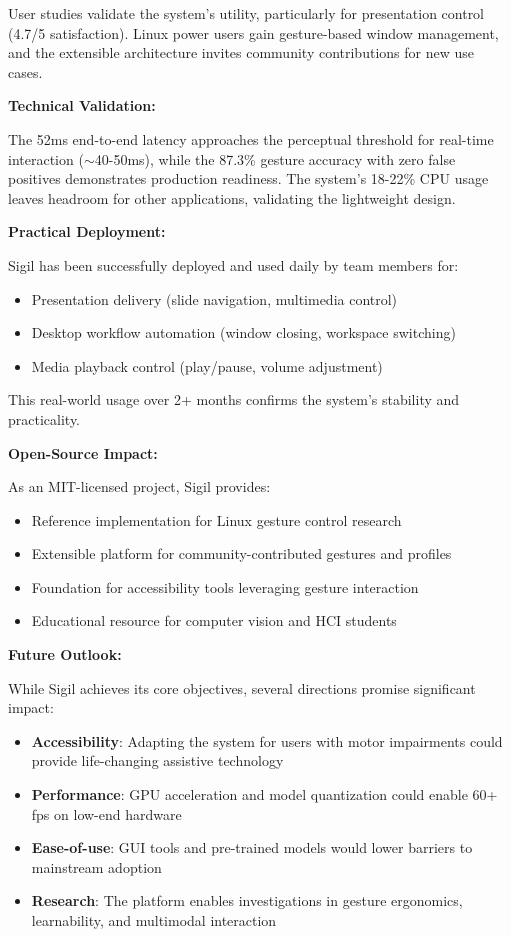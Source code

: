 \documentclass[11pt,a4paper]{article}
\begin{document}
User studies validate the system's utility, particularly for presentation control (4.7/5 satisfaction). Linux power users gain gesture-based window management, and the extensible architecture invites community contributions for new use cases.

\textbf{Technical Validation:}

The 52ms end-to-end latency approaches the perceptual threshold for real-time interaction ($\sim$40-50ms), while the 87.3\% gesture accuracy with zero false positives demonstrates production readiness. The system's 18-22\% CPU usage leaves headroom for other applications, validating the lightweight design.

\textbf{Practical Deployment:}

Sigil has been successfully deployed and used daily by team members for:
\begin{itemize}
\item Presentation delivery (slide navigation, multimedia control)
\item Desktop workflow automation (window closing, workspace switching)
\item Media playback control (play/pause, volume adjustment)
\end{itemize}

This real-world usage over 2+ months confirms the system's stability and practicality.

\textbf{Open-Source Impact:}

As an MIT-licensed project, Sigil provides:
\begin{itemize}
\item Reference implementation for Linux gesture control research
\item Extensible platform for community-contributed gestures and profiles
\item Foundation for accessibility tools leveraging gesture interaction
\item Educational resource for computer vision and HCI students
\end{itemize}

\textbf{Future Outlook:}

While Sigil achieves its core objectives, several directions promise significant impact:

\begin{itemize}
\item \textbf{Accessibility}: Adapting the system for users with motor impairments could provide life-changing assistive technology
\item \textbf{Performance}: GPU acceleration and model quantization could enable 60+ fps on low-end hardware
\item \textbf{Ease-of-use}: GUI tools and pre-trained models would lower barriers to mainstream adoption
\item \textbf{Research}: The platform enables investigations in gesture ergonomics, learnability, and multimodal interaction
\end{itemize}
\end{document}

